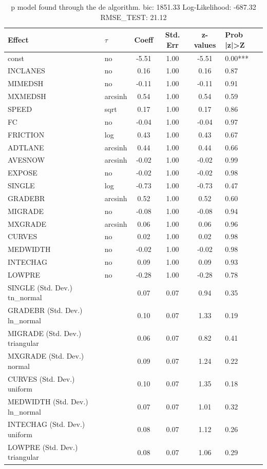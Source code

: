 \begin{table}
	\caption{p model found through the de algorithm. bic: 1851.33 Log-Likelihood: -687.32 RMSE_TEST: 21.12}
	\begin{center}
		\begin{tabular}{|l|l|c|c|c|l|}
			\hline
			Effect & $\tau$ & Coeff & Std. Err & z-values & Prob |z|>Z \\
			\hline
			const & no & -5.51 & 1.00 & -5.51 & 0.00*** \\
			\hline
			INCLANES & no & 0.16 & 1.00 & 0.16 & 0.87 \\
			\hline
			MIMEDSH & no & -0.11 & 1.00 & -0.11 & 0.91 \\
			\hline
			MXMEDSH & arcsinh & 0.54 & 1.00 & 0.54 & 0.59 \\
			\hline
			SPEED & sqrt & 0.17 & 1.00 & 0.17 & 0.86 \\
			\hline
			FC & no & -0.04 & 1.00 & -0.04 & 0.97 \\
			\hline
			FRICTION & log & 0.43 & 1.00 & 0.43 & 0.67 \\
			\hline
			ADTLANE & arcsinh & 0.44 & 1.00 & 0.44 & 0.66 \\
			\hline
			AVESNOW & arcsinh & -0.02 & 1.00 & -0.02 & 0.99 \\
			\hline
			EXPOSE & no & -0.02 & 1.00 & -0.02 & 0.98 \\
			\hline
			SINGLE & log & -0.73 & 1.00 & -0.73 & 0.47 \\
			\hline
			GRADEBR & arcsinh & 0.52 & 1.00 & 0.52 & 0.60 \\
			\hline
			MIGRADE & no & -0.08 & 1.00 & -0.08 & 0.94 \\
			\hline
			MXGRADE & arcsinh & 0.06 & 1.00 & 0.06 & 0.96 \\
			\hline
			CURVES & no & 0.02 & 1.00 & 0.02 & 0.98 \\
			\hline
			MEDWIDTH & no & -0.02 & 1.00 & -0.02 & 0.98 \\
			\hline
			INTECHAG & no & 0.09 & 1.00 & 0.09 & 0.93 \\
			\hline
			LOWPRE & no & -0.28 & 1.00 & -0.28 & 0.78 \\
			\hline
			SINGLE (Std. Dev.) tn_normal &  & 0.07 & 0.07 & 0.94 & 0.35 \\
			\hline
			GRADEBR (Std. Dev.) ln_normal &  & 0.10 & 0.07 & 1.33 & 0.19 \\
			\hline
			MIGRADE (Std. Dev.) triangular &  & 0.06 & 0.07 & 0.82 & 0.41 \\
			\hline
			MXGRADE (Std. Dev.) normal &  & 0.09 & 0.07 & 1.24 & 0.22 \\
			\hline
			CURVES (Std. Dev.) uniform &  & 0.10 & 0.07 & 1.35 & 0.18 \\
			\hline
			MEDWIDTH (Std. Dev.) ln_normal &  & 0.07 & 0.07 & 1.01 & 0.32 \\
			\hline
			INTECHAG (Std. Dev.) uniform &  & 0.08 & 0.07 & 1.12 & 0.26 \\
			\hline
			LOWPRE (Std. Dev.) triangular &  & 0.08 & 0.07 & 1.06 & 0.29 \\
			\hline
		\end{tabular}
	\end{center}
\end{table}